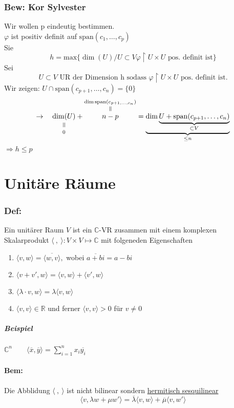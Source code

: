 \documentclass[titlepage,12pt,a4paper,ngerman]{report}
\newcommand{\verteq}{\rotatebox{90}{$\,=$}}
\newcommand{\equalto}[2]{\underset{\scriptstyle\overset{\mkern4mu\verteq}{#2}}{#1}}
\newcommand{\equaltoup}[2]{\overset{\scriptstyle\underset{\mkern4mu\verteq}{#2}}{#1}}
\newcommand{\tx}[1]{\textrm{#1}}
\newcommand{\ub}[1]{\underbrace{#1}}
\newcommand{\spa}{\tx{span}}
\newcommand{\summ}[2]{\sum_{#1}^{#2}}
\begin{document}
\subsection{Bew: Kor Sylvester}
Wir wollen p eindeutig bestimmen.\\
$ \varphi $ ist positiv definit auf $ \spa(c_1,\dots,c_p) $\\
Sie $$ h = \tx{max} \{\dim (U) / U \subset V \varphi\upharpoonright U \times U \tx{ pos. definit ist}\} $$
Sei $$ U \subset V \tx{ UR der Dimension h sodass } \varphi \upharpoonright U \times U \tx{ pos. definit ist.}$$
Wir zeigen: $ U \cap \spa (c_{p+1},\dots,c_n) = \{0\} $\\
$$ \rightarrow\quad  \equalto{\dim(U)}{0} + \equaltoup{n - p}{\dim \spa(c_{p+1,\dots,c_n})} = \ub{\dim \ub{U + \spa(c_{p+1},\dots,c_n)}_{\subset V}}_{\le n} $$
$ \Rightarrow h \le p  $

\chapter{Unitäre Räume}
\subsection{Def:} Ein unitärer Raum $V$ ist ein $\mathbb C$-VR zusammen mit einem komplexen Skalarprodukt $\langle\ ,\ \rangle : V \times V \mapsto \mathbb C$ mit folgeneden Eigenschaften
\begin{enumerate}
	\item $\langle v,w \rangle = \overline{\langle w,v \rangle},$ wobei $\overline{a+bi}=a-bi$
	\item $\langle v+ v', w \rangle = \langle v,w \rangle + \langle v',w \rangle$
	\item $\langle \lambda \cdot v, w \rangle = \lambda \langle v,w \rangle$
	\item $\langle v,v \rangle \in \mathbb R$ und ferner $\langle v,v \rangle > 0$ für $v \neq 0$ 
\end{enumerate}
\paragraph{Beispiel} $\mathbb C^n \qquad \langle \overline x, \overline y \rangle = \summ{i = 1}{n} x_i \overline{y_i}$

\subsubsection{Bem:}
Die Abblidung $ \langle\ ,\ \rangle $ ist nicht bilinear sondern \underline{hermitisch sesquilinear}
$$ \langle v,\lambda w + \mu w'\rangle = \overline{\lambda}\langle v,w \rangle + \overline{\mu} \langle v,w' \rangle$$
\end{document}

